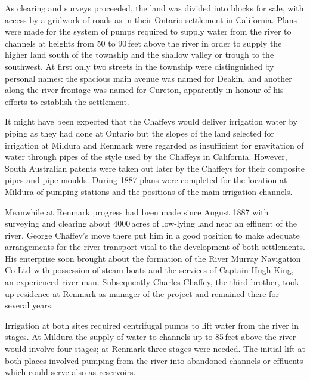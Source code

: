 As clearing and surveys proceeded, the land was divided into blocks
for sale, with access by a gridwork of roads as in their Ontario
settlement in California.  Plans were made for the
system of pumps required to supply
water from the river to channels
at heights from 50 to 90\,feet above the river in order to supply the
higher land south of the township and the shallow valley or trough to
the southwest.  At first only two streets in the township were
distinguished by personal names: the spacious main avenue was named
for Deakin, and another along the river frontage was named for
Cureton, apparently in honour of his efforts to establish the
settlement.

It might have been expected that the Chaffeys would deliver irrigation
water by piping as they had done at Ontario but the slopes of the land
selected for irrigation at Mildura and Renmark were regarded as
insufficient for gravitation of water through pipes of the style used
by the Chaffeys in California.  However, South Australian patents were
taken out later by the Chaffeys for their composite
pipes and pipe
moulds.  During 1887 plans were completed for the location at Mildura
of pumping stations and the positions of the main irrigation
channels.

Meanwhile at Renmark progress had been made since August 1887 with
surveying and clearing about 4000\,acres of low-lying land near an
effluent of the river.  George Chaffey's move there put him in a good
position to make adequate arrangements for the river transport vital
to the development of both settlements.  His enterprise soon brought
about the formation of the River Murray Navigation Co Ltd with
possession of steam-boats and the services of Captain Hugh King,
 an experienced river-man. 
Subsequently Charles Chaffey,  the third brother,
took up residence at Renmark as manager of the project and remained
there for several years.

Irrigation at both sites required centrifugal pumps
 to lift water from the river in
stages.  At Mildura the supply of water to
channels up to 85\,feet above the river
would involve four stages; at Renmark three stages were needed.  The
initial lift at both places involved pumping from the river into
abandoned channels or effluents which could serve also as
reservoirs.

